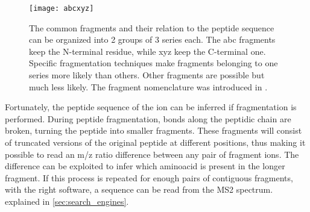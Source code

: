 \begin{figure}[!h]
\centering
\texttt{[image: abcxyz]}
\caption{The common fragments and their relation to the peptide sequence can be organized into 2 groups of 3 series each. The abc fragments keep the N-terminal residue, while xyz keep the C-terminal one. Specific fragmentation techniques make fragments belonging to one series more likely than others. Other fragments are possible but much less likely. The fragment nomenclature was introduced in \cite{Roepstorff1984}.}
\label{fig:abcxyz}
\end{figure}


Fortunately, the peptide sequence of the ion can be inferred if fragmentation is performed. During peptide fragmentation, bonds along the peptidic chain are broken, turning the peptide into smaller fragments. These fragments will consist of truncated versions of the original peptide at different positions, thus making it possible to read an \ac{m/z} ratio difference between any pair of fragment ions. The difference can be exploited to infer which aminoacid is present in the longer fragment. If this process is repeated for enough pairs of contiguous fragments, with the right software, a sequence can be read from the \ac{MS2} spectrum.  explained in \ref{sec:search_engines}.




%
%
 

